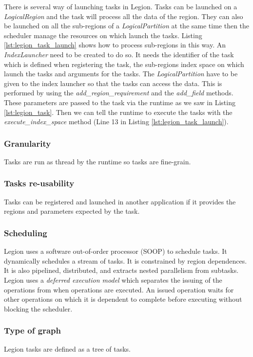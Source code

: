 There is several way of launching tasks in Legion.
Tasks can be launched on a \textit{LogicalRegion} and  the task will process all the data of the region.
They can also be launched on all the sub-regions of a \textit{LogicalPartition} at the same time then the scheduler manage the resources on which launch the tasks.
Listing \ref{lst:legion_task_launch} shows how to process sub-regions in this way.
An \textit{IndexLauncher} need to be created to do so.
It needs the identifier of the task which is defined when registering the task, the sub-regions index space on which launch the tasks and arguments for the tasks.
The \textit{LogicalPartition} have to be given to the index launcher so that the tasks can access the data.
This is performed by using the \textit{add\_region\_requirement} and the \textit{add\_field} methods.
These parameters are passed to the task via the runtime as we saw in Listing \ref{lst:legion_task}.
Then we can tell the runtime to execute the tasks with the \textit{execute\_index\_space} method (Line 13 in Listing \ref{lst:legion_task_launch}).

\subsubsection{Granularity}
Tasks are run as thread by the runtime so tasks are fine-grain.

\subsubsection{Tasks re-usability}
Tasks can be registered and launched in another application if it provides the regions and parameters expected by the task.

\subsubsection{Scheduling}
Legion uses a software out-of-order processor (SOOP) to schedule tasks.
It dynamically schedules a stream of tasks.
It is constrained by region dependences.
It is also pipelined, distributed, and extracts nested parallelism from subtasks.
Legion uses a \textit{deferred execution model} which separates the issuing of the operations from when operations are executed.
An issued operation waits for other operations on which it is dependent to complete before executing without blocking the scheduler.

\subsubsection{Type of graph}
Legion tasks are defined as a tree of tasks.

